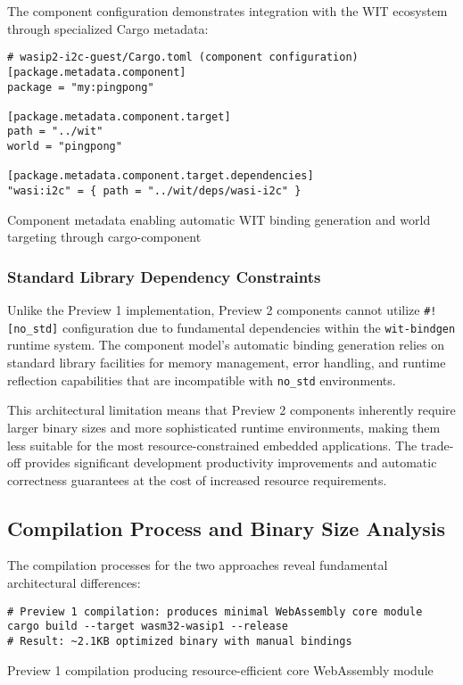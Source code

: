 The component configuration demonstrates integration with the WIT ecosystem through specialized Cargo metadata:

\begin{listing}[H]
\begin{verbatim}
# wasip2-i2c-guest/Cargo.toml (component configuration)
[package.metadata.component]
package = "my:pingpong"

[package.metadata.component.target]
path = "../wit"
world = "pingpong"

[package.metadata.component.target.dependencies]
"wasi:i2c" = { path = "../wit/deps/wasi-i2c" }
\end{verbatim}
\caption{Component metadata enabling automatic WIT binding generation and world targeting through cargo-component}
\label{lst:component-config}
\end{listing}

\subsubsection{Standard Library Dependency Constraints}

Unlike the Preview 1 implementation, Preview 2 components cannot utilize \texttt{\#![no\_std]} configuration due to fundamental dependencies within the \texttt{wit-bindgen} runtime system. The component model's automatic binding generation relies on standard library facilities for memory management, error handling, and runtime reflection capabilities that are incompatible with \texttt{no\_std} environments.

This architectural limitation means that Preview 2 components inherently require larger binary sizes and more sophisticated runtime environments, making them less suitable for the most resource-constrained embedded applications. The trade-off provides significant development productivity improvements and automatic correctness guarantees at the cost of increased resource requirements.

\subsection{Compilation Process and Binary Size Analysis}

The compilation processes for the two approaches reveal fundamental architectural differences:

\begin{listing}[H]
\begin{verbatim}
# Preview 1 compilation: produces minimal WebAssembly core module
cargo build --target wasm32-wasip1 --release
# Result: ~2.1KB optimized binary with manual bindings
\end{verbatim}
\caption{Preview 1 compilation producing resource-efficient core WebAssembly module}
\label{lst:preview1-compilation}
\end{listing}

